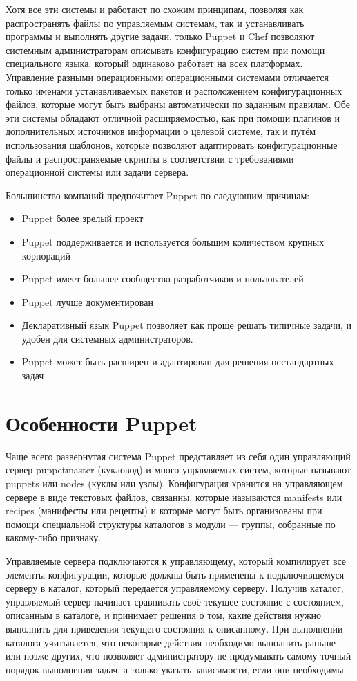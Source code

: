 Хотя все эти системы и работают по схожим принципам, позволяя как распространять файлы по управляемым системам, так и устанавливать программы и выполнять другие задачи, только Puppet и Chef позволяют системным администраторам описывать конфигурацию систем при помощи специального языка, который одинаково работает на всех платформах. Управление разными операционными операционными системами отличается только именами устанавливаемых пакетов и расположением конфигурационных файлов, которые могут быть выбраны автоматически по заданным правилам. Обе эти системы обладают отличной расширяемостью, как при помощи плагинов и дополнительных источников информации о целевой системе, так и путём использования шаблонов, которые позволяют адаптировать конфигурационные файлы и распространяемые скрипты в соответствии с требованиями операционной системы или задачи сервера.
	
Большинство компаний предпочитает Puppet по следующим причинам:

\begin{itemize}
\item Puppet более зрелый проект
\item Puppet поддерживается и используется большим количеством крупных корпораций
\item Puppet имеет большее сообщество разработчиков и пользователей
\item Puppet лучше документирован
\item Декларативный язык Puppet позволяет как проще решать типичные задачи, и удобен для системных администраторов.
\item Puppet может быть расширен и адаптирован для решения нестандартных задач
\end{itemize}

\section{Особенности Puppet}

Чаще всего развернутая система Puppet представляет из себя один управляющий сервер puppetmaster (кукловод) и много управляемых систем, которые называют puppets или nodes (куклы или узлы). Конфигурация хранится на управляющем сервере в виде текстовых файлов, связанны, которые называются manifests или recipes (манифесты или рецепты) и которые могут быть организованы при помощи специальной структуры каталогов в модули — группы, собранные по какому-либо признаку.
	
Управляемые сервера подключаются к управляющему, который компилирует все элементы конфигурации, которые должны быть применены к подключившемуся серверу в каталог, который передается управляемому серверу. Получив каталог, управляемый сервер начинает сравнивать своё текущее состояние с состоянием, описанным в каталоге, и принимает решения о том, какие действия нужно выполнить для приведения текущего состояния к описанному. При выполнении каталога учитывается, что некоторые действия необходимо выполнить раньше или позже других, что позволяет администратору не продумывать самому точный порядок выполнения задач, а только указать зависимости, если они необходимы.  


